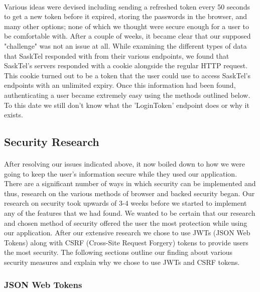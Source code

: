 \documentclass[12pt]{article}
\begin{document}
\paragraph{}
	Various ideas were devised including sending a refreshed token every 50 seconds to get a new token before it expired, storing the passwords in the browser, and many other options; none of which we thought were secure enough for a user to be comfortable with. After a couple of weeks, it became clear that our supposed "challenge" was not an issue at all. While examining the different types of data that SaskTel responded with from their various endpoints, we found that SaskTel's servers responded with a cookie alongside the regular HTTP request. This cookie turned out to be a token that the user could use to access SaskTel's endpoints with an unlimited expiry. Once this information had been found, authenticating a user became extremely easy using the methods outlined below. To this date we still don't know what the 'LoginToken' endpoint does or why it exists.

\subsection{Security Research}
\paragraph{}
	After resolving our issues indicated above, it now boiled down to how we were going to keep the user's information secure while they used our application. There are a significant number of ways in which security can be implemented and thus, research on the various methods of browser and backed security began. Our research on security took upwards of 3-4 weeks before we started to implement any of the features that we had found. We wanted to be certain that our research and chosen method of security offered the user the most protection while using our application. After our extensive research we chose to use JWTs (JSON Web Tokens) along with CSRF (Cross-Site Request Forgery) tokens to provide users the most security. The following sections outline our finding about various security measures and explain why we chose to use JWTs and CSRF tokens.

	\subsubsection{JSON Web Tokens}
\end{document}

